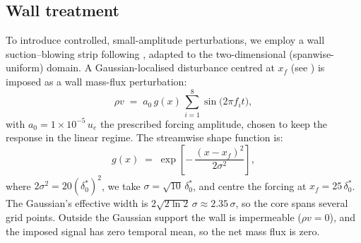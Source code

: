 
\subsection{Wall treatment}

To introduce controlled, small-amplitude perturbations, we employ a wall suction--blowing strip following \cite{AlamSandham2000}, adapted to the two-dimensional (spanwise-uniform) domain. A Gaussian-localised disturbance centred at $x_f$ (see ) is imposed as a wall mass-flux perturbation:
\begin{equation}
  \rho v \;=\; a_0\, g(x)\, \sum_{i=1}^{8} \sin\!\big(2\pi f_i t\big),
\end{equation}
with $a_0 = 1\times10^{-5}\,u_e$ the prescribed forcing amplitude, chosen to keep the response in the linear regime. The streamwise shape function is:
\begin{equation}
  g(x) \;=\; \exp\!\left[-\,\frac{(x-x_f)^2}{2\sigma^2}\right],
\end{equation}
where $2\sigma^2 = 20(\delta_0^{*})^2$, we take $\sigma=\sqrt{10}\,\delta_0^{*}$, and centre the forcing at $x_f = 25\,\delta_0^{*}$. The Gaussian's effective width is $2\sqrt{2\ln 2}\,\sigma \approx 2.35\,\sigma$, so the core spans several grid points. Outside the Gaussian support the wall is impermeable ($\rho v=0$), and the imposed signal has zero temporal mean, so the net mass flux is zero.


